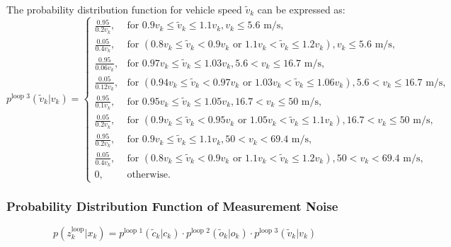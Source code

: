 The probability distribution function for vehicle speed \( \tilde v_k \) can be expressed as:
\begin{equation}
    p^\text{loop 3}(\tilde{v}_k | v_k) = 
    \begin{cases}
        \frac{0.95}{0.2 v_k}, & \text{for } 0.9 v_k \leq \tilde{v}_k \leq 1.1 v_k, v_k \leq 5.6 \text{ m/s,}  \\
        \frac{0.05}{0.4 v_k}, & \text{for } (0.8 v_k \leq \tilde{v}_k < 0.9 v_k \text{ or } 1.1 v_k < \tilde{v}_k \leq 1.2 v_k), v_k \leq 5.6 \text{ m/s,} \\
        \frac{0.95}{0.06 v_k}, & \text{for } 0.97 v_k \leq \tilde{v}_k \leq 1.03 v_k, 5.6 < v_k \leq 16.7 \text{ m/s,} \\
        \frac{0.05}{0.12 v_k}, & \text{for } (0.94 v_k \leq \tilde{v}_k < 0.97 v_k \text{ or } 1.03 v_k < \tilde{v}_k \leq 1.06 v_k), 5.6 < v_k \leq 16.7 \text{ m/s,} \\
        \frac{0.95}{0.1 v_k}, & \text{for } 0.95 v_k \leq \tilde{v}_k \leq 1.05 v_k, 16.7 < v_k \leq 50 \text{ m/s,} \\
        \frac{0.05}{0.2 v_k}, & \text{for } (0.9 v_k \leq \tilde{v}_k < 0.95 v_k \text{ or } 1.05 v_k < \tilde{v}_k \leq 1.1 v_k), 16.7 < v_k \leq 50 \text{ m/s,} \\
        \frac{0.95}{0.2 v_k}, & \text{for } 0.9 v_k \leq \tilde{v}_k \leq 1.1 v_k, 50 < v_k < 69.4 \text{ m/s,} \\
        \frac{0.05}{0.4 v_k}, & \text{for } (0.8 v_k \leq \tilde{v}_k < 0.9 v_k \text{ or } 1.1 v_k < \tilde{v}_k \leq 1.2 v_k), 50 < v_k < 69.4 \text{ m/s,} \\
        0, & \text{otherwise}.
    \end{cases}
\end{equation}





\subsubsection{Probability Distribution Function of Measurement Noise}
\begin{equation}\label{loop probability}
p(z_k^\text{loop}| x_k) = p^\text{loop 1}(\tilde c_k | c_k) \cdot p^\text{loop 2}(\tilde o_k | o_k) \cdot p^\text{loop 3}(\tilde v_k | v_k)
\end{equation}




